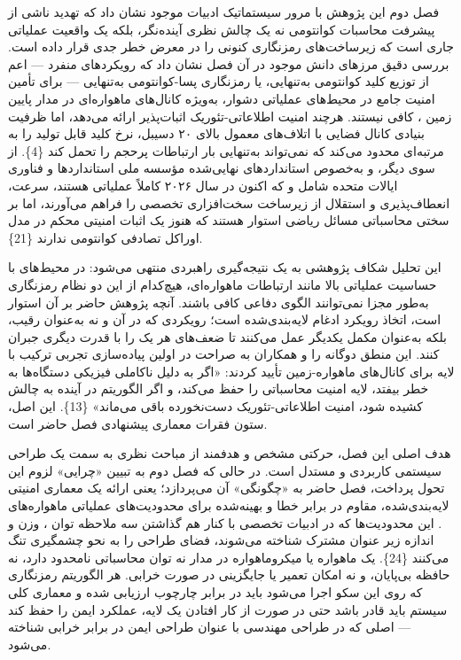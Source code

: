 \documentclass[a4paper,14pt]{extreport}
\begin{document}
فصل دوم این پژوهش با مرور سیستماتیک ادبیات موجود نشان داد که تهدید ناشی از پیشرفت محاسبات کوانتومی  نه یک چالش نظری آینده‌نگر، بلکه یک واقعیت عملیاتی جاری است که زیرساخت‌های رمزنگاری کنونی را در معرض خطر جدی قرار داده است. بررسی دقیق مرزهای دانش موجود در آن فصل نشان داد که رویکردهای منفرد --- اعم از توزیع کلید کوانتومی  به‌تنهایی، یا رمزنگاری پسا-کوانتومی  به‌تنهایی --- برای تأمین امنیت جامع در محیط‌های عملیاتی دشوار، به‌ویژه کانال‌های ماهواره‌ای در مدار پایین زمین ، کافی نیستند.  هرچند امنیت اطلاعاتی-تئوریک  اثبات‌پذیر ارائه می‌دهد، اما ظرفیت بنیادی کانال فضایی با اتلاف‌های معمول بالای ۲۰ دسیبل، نرخ کلید قابل تولید را به مرتبه‌ای محدود می‌کند که نمی‌تواند به‌تنهایی بار ارتباطات پرحجم را تحمل کند \{4\}. از سوی دیگر،  و به‌خصوص استانداردهای نهایی‌شده مؤسسه ملی استانداردها و فناوری ایالات متحده  شامل  و  که اکنون در سال ۲۰۲۶ کاملاً عملیاتی هستند، سرعت، انعطاف‌پذیری و استقلال از زیرساخت سخت‌افزاری تخصصی را فراهم می‌آورند، اما بر سختی محاسباتی مسائل ریاضی استوار هستند که هنوز یک اثبات امنیتی محکم  در مدل اوراکل تصادفی کوانتومی  ندارند \{21\}.

این تحلیل شکاف پژوهشی به یک نتیجه‌گیری راهبردی منتهی می‌شود: در محیط‌های با حساسیت عملیاتی بالا مانند ارتباطات ماهواره‌ای، هیچ‌کدام از این دو نظام رمزنگاری به‌طور مجزا نمی‌توانند الگوی دفاعی کافی باشند. آنچه پژوهش حاضر بر آن استوار است، اتخاذ رویکرد ادغام لایه‌بندی‌شده  است؛ رویکردی که در آن  و  نه به‌عنوان رقیب، بلکه به‌عنوان مکمل یکدیگر عمل می‌کنند تا ضعف‌های هر یک را با قدرت دیگری جبران کنند. این منطق دوگانه را  و همکاران به صراحت در اولین پیاده‌سازی تجربی ترکیب  با لایه  برای کانال‌های ماهواره-زمین تأیید کردند: «اگر  به دلیل ناکاملی فیزیکی دستگاه‌ها به خطر بیفتد، لایه  امنیت محاسباتی را حفظ می‌کند، و اگر الگوریتم  در آینده به چالش کشیده شود، امنیت اطلاعاتی-تئوریک  دست‌نخورده باقی می‌ماند» \{13\}. این اصل، ستون فقرات معماری پیشنهادی فصل حاضر است.

هدف اصلی این فصل، حرکتی مشخص و هدفمند از مباحث نظری به سمت یک طراحی سیستمی کاربردی و مستدل است. در حالی که فصل دوم به تبیین «چرایی» لزوم این تحول پرداخت، فصل حاضر به «چگونگی» آن می‌پردازد؛ یعنی ارائه یک معماری امنیتی لایه‌بندی‌شده، مقاوم در برابر خطا  و بهینه‌شده برای محدودیت‌های عملیاتی ماهواره‌های . این محدودیت‌ها که در ادبیات تخصصی با کنار هم گذاشتن سه ملاحظه توان ، وزن  و اندازه  زیر عنوان مشترک  شناخته می‌شوند، فضای طراحی را به نحو چشمگیری تنگ می‌کنند \{24\}. یک ماهواره  یا میکروماهواره در مدار  نه توان محاسباتی نامحدود دارد، نه حافظه بی‌پایان، و نه امکان تعمیر یا جایگزینی در صورت خرابی. هر الگوریتم رمزنگاری که روی این سکو اجرا می‌شود باید در برابر چارچوب  ارزیابی شده و معماری کلی سیستم باید قادر باشد حتی در صورت از کار افتادن یک لایه، عملکرد ایمن را حفظ کند --- اصلی که در طراحی مهندسی با عنوان طراحی ایمن در برابر خرابی  شناخته می‌شود.
\end{document}
